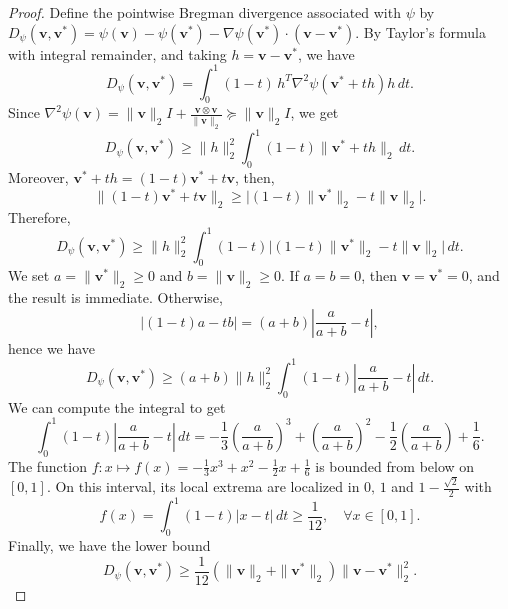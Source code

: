 \documentclass[10pt,a4paper]{amsart}
\newcommand{\bv}{\mathbf{v}}
\begin{document}
\begin{proof}
Define the pointwise Bregman divergence associated with \(\psi\) by $ D_\psi(\bv,\bv^*)
    =
    \psi(\bv)-\psi(\bv^*)-\nabla\psi(\bv^*)\cdot(\bv-\bv^*).$
By Taylor's formula with integral remainder, and taking $h=\bv-\bv^*$, we have
\[
    D_\psi(\bv,\bv^*)
    =
    \int_0^1
    (1-t)\,
    h^T\nabla^2\psi(\bv^*+th)h\,dt.
\]
Since $\nabla^2\psi(\bv)=
    \|\bv\|_2 I+\frac{\bv\otimes \bv}{\|\bv\|_2} \succeq
    \|\bv\|_2 I$, we get
$$
    D_\psi(\bv,\bv^*)\geq \|h\|_2^2 \int_0^1
    (1-t)\|\bv^*+t h\|_2\,dt.
$$
Moreover, $\bv^*+t h=(1-t)\bv^*+t \bv$, then,
\[
\|(1-t)\bv^*+t\bv\|_2 \geq \bigl| (1-t) \|\bv^*\|_2-t\|\bv\|_2 \bigr|.
\]
Therefore,
\[
    D_\psi(\bv,\bv^*)
    \geq
    \|h\|_2^2 \int_0^1 (1-t)
    \bigl| (1-t)\|\bv^*\|_2-t\|\bv\|_2 \bigr|\,dt.
\]
We set $a=\|\bv^*\|_2\ge 0$ and $b=\| \bv\|_2 \ge0$.
If \(a=b=0\), then \(\bv=\bv^*=0\), and the result is immediate. Otherwise,
\[
    \bigl| (1-t)a-tb \bigr|
    =
    (a+b)\left| \frac{a}{a+b}-t\right|,
\]
hence we have
\[
    D_\psi(\bv,\bv^*)
    \geq
    (a+b)\|h\|_2^2
    \int_0^1
    (1-t)\left |\frac{a}{a+b}-t\right |\,dt.
\]
We can compute the integral to get
\[
    \int_0^1
    (1-t)\left |\frac{a}{a+b}-t\right |\,dt
    =
    -\frac{1}{3}\left (\frac{a}{a+b}\right )^3
    +\left (\frac{a}{a+b}\right )^2
    -\frac{1}{2} \left (\frac{a}{a+b}\right )
    +\frac16.
\]
The function $f: x \mapsto f(x) = -\frac{1}{3}x^3+x^2-\frac{1}{2} x+\frac16$ is bounded from below on \( [0,1]\). On this interval, its local extrema are localized in $0,\, 1$ and $1- \frac{\sqrt{2}}{2}$ with
\[f(x) = \int_0^1(1-t)|x-t|\,dt \geq \frac1{12},\quad \forall x\in [0, 1].
\]
Finally, we have the lower bound
\[
    D_\psi(\bv,\bv^*)
    \geq
    \frac1{12}
    \left (\|\bv\|_2+\|\bv^*\|_2\right )\|\bv -\bv^*\|_2^2.
\]
\end{proof}
\end{document}
